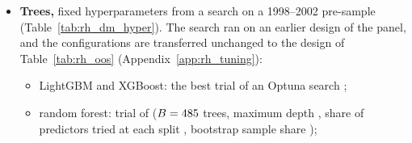 \begin{itemize}
\begin{itemize}
  \end{itemize}
\item \textbf{Trees,} fixed hyperparameters from a search on a 1998--2002 pre-sample (Table~\ref{tab:rh_dm_hyper}).
  The search ran on an earlier design of the panel, and the configurations are transferred unchanged to the design
  of Table~\ref{tab:rh_oos} (Appendix~\ref{app:rh_tuning}):
  \begin{itemize}
  \item LightGBM and XGBoost: the best trial of an Optuna search \citep{Akiba2019};
  \item random forest: trial \rhdmRfTrial{} of \cmTreeProvRfTrials{} ($B = 485$ trees, maximum depth
    \cmTreeProvRfDepth, share of predictors tried at each split \cmTreeProvRfFeatures, bootstrap sample share
    \cmTreeProvRfSamples);

\end{itemize}
\end{itemize}
